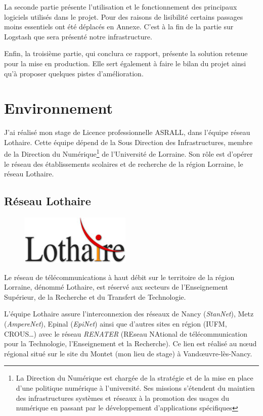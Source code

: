 \documentclass[a4paper,12pt,one side,titlepage]{report}
\begin{document}
La seconde partie présente l'utilisation et le fonctionnement des principaux logiciels
utilisés dans le projet. Pour des raisons de lisibilité certains passages moins 
essentiels ont été déplacés en Annexe. C'est à la fin de la partie sur Logstash que
sera présenté notre infrastructure.

Enfin, la troisième partie, qui conclura ce rapport,  présente la solution retenue 
pour la mise en production. Elle sert également à faire le bilan du projet ainsi 
qu'à proposer quelques pistes d'amélioration.


\chapter{Environnement}
J'ai réalisé mon stage de Licence professionnelle ASRALL, dans l'équipe réseau Lothaire.
Cette équipe dépend de la Sous Direction des Infrastructures, membre de la Direction 
du Numérique\footnote{La Direction du Numérique est chargée de la stratégie et de la 
mise en place d'une politique numérique à l'université. Ses missions s'étendent du maintien 
des infrastructures systèmes et réseaux à la promotion des usages du numérique en passant
par le développement d'applications spécifiques} de l'Université de Lorraine. Son rôle est 
d'opérer le réseau des établissements scolaires et de recherche de la région Lorraine, le 
réseau Lothaire.
\section{Réseau Lothaire}
\begin{figure}[H]
\center
\includegraphics{lothaire.jpg}
\end{figure}
Le réseau de télécommunications à haut débit sur le territoire de la région Lorraine, 
dénommé Lothaire, est réservé aux secteurs de l’Enseignement Supérieur, de la Recherche 
et du Transfert de Technologie. 

L'équipe Lothaire assure l’interconnexion des réseaux de Nancy (\emph{StanNet}), 
Metz (\emph{AmpereNet}), Epinal (\emph{EpiNet}) ainsi que d'autres sites en région 
(IUFM, CROUS\ldots) avec le réseau \emph{RENATER} (REseau NAtional de télécommunication 
pour la Technologie, l'Enseignement et la Recherche). Ce lien est réalisé au nœud 
régional situé sur le site du Montet (mon lieu de stage) à Vandœuvre-lès-Nancy.
\end{document}
